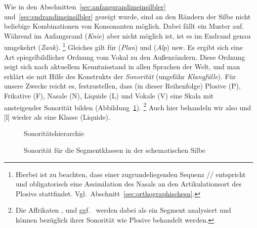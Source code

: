Wie in den Abschnitten~\ref{sec:anfangsrandimeinsilbler} und~\ref{sec:endrandimeinsilbler} gezeigt wurde, sind an den Rändern der Silbe nicht beliebige Kombinationen von Konsonanten möglich.
Dabei fällt ein Muster auf.
Während im Anfangsrand \zB \textipa{[kn]} (\textit{Knie}) aber nicht \textipa{[Nk]} möglich ist, ist es im Endrand genau umgekehrt (\textit{Zank}).%
\footnote{Hierbei ist zu beachten, dass \textipa{[Nk]} einer zugrundeliegenden Sequenz // entspricht und obligatorisch eine Assimilation des Nasals an den Artikulationsort des Plosivs stattfindet. Vgl.\ Abschnitt~\ref{sec:orthographischesn}.}
Gleiches gilt für \textipa{[pl]} (\textit{Plan}) und \textipa{[lp]} (\textit{Alp}) usw.
Es ergibt sich eine Art spiegelbildlicher Ordnung vom Vokal zu den Außenrändern.
Diese Ordnung zeigt sich nach aktuellem Kenntnisstand in allen Sprachen der Welt, und man erklärt sie mit Hilfe des Konstrukts der \textit{Sonorität} (ungefähr \textit{Klangfülle}).
Für unsere Zwecke reicht es, festzustellen, dass (in dieser Reihenfolge) Plosive (P), Frikative (F), Nasale (N), Liquide (L) und Vokale (V) eine Skala mit ansteigender Sonorität bilden (Abbildung~\ref{fig:sonoritaetshierarchie}).%
\footnote{Die Affrikaten \textipa{[\t{ts}]}, \textipa{[\t{pf}]} und ggf.\ \textipa{[\t{tS}]} werden dabei als ein Segment analysiert und können bezüglich ihrer Sonorität wie Plosive behandelt werden.}
Auch hier behandeln wir also \textipa{[K]} und [l] wieder als eine Klasse (Liquide).


\begin{figure}[!htbp]
  \centering
  \caption{Sonoritätshierarchie}
  \label{fig:sonoritaetshierarchie}
\end{figure}

\begin{figure}[!htbp]
  \centering
  \caption{Sonorität für die Segmentklassen in der schematischen Silbe}
  \label{fig:sonhier}
\end{figure}

